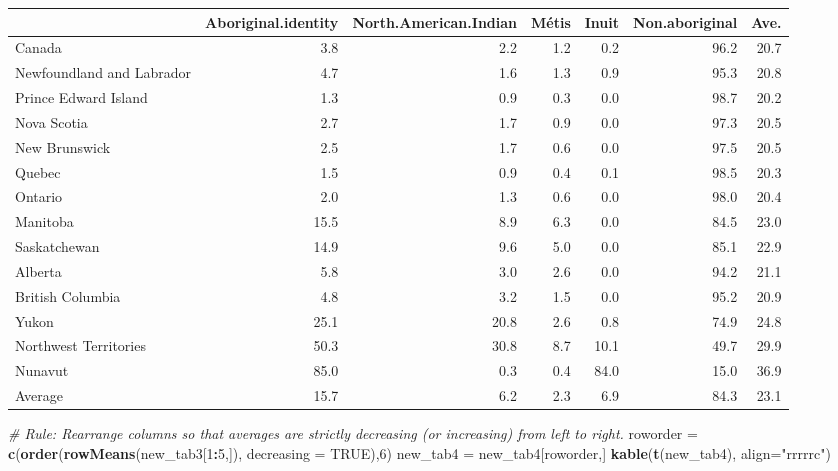 \documentclass[9pt,letter]{article}
\newenvironment{Shaded}{\begin{snugshade}}{\end{snugshade}}
\newcommand{\KeywordTok}[1]{\textcolor[rgb]{0.13,0.29,0.53}{\textbf{#1}}}
\newcommand{\DataTypeTok}[1]{\textcolor[rgb]{0.13,0.29,0.53}{#1}}
\newcommand{\DecValTok}[1]{\textcolor[rgb]{0.00,0.00,0.81}{#1}}
\newcommand{\StringTok}[1]{\textcolor[rgb]{0.31,0.60,0.02}{#1}}
\newcommand{\CommentTok}[1]{\textcolor[rgb]{0.56,0.35,0.01}{\textit{#1}}}
\newcommand{\OtherTok}[1]{\textcolor[rgb]{0.56,0.35,0.01}{#1}}
\newcommand{\OperatorTok}[1]{\textcolor[rgb]{0.81,0.36,0.00}{\textbf{#1}}}
\newcommand{\NormalTok}[1]{#1}
\begin{document}
\begin{longtable}[]{@{}lrrrrrr@{}}
\toprule
& Aboriginal.identity & North.American.Indian & Métis & Inuit &
Non.aboriginal & Ave.\tabularnewline
\midrule
\endhead
Canada & 3.8 & 2.2 & 1.2 & 0.2 & 96.2 & 20.7\tabularnewline
Newfoundland and Labrador & 4.7 & 1.6 & 1.3 & 0.9 & 95.3 &
20.8\tabularnewline
Prince Edward Island & 1.3 & 0.9 & 0.3 & 0.0 & 98.7 &
20.2\tabularnewline
Nova Scotia & 2.7 & 1.7 & 0.9 & 0.0 & 97.3 & 20.5\tabularnewline
New Brunswick & 2.5 & 1.7 & 0.6 & 0.0 & 97.5 & 20.5\tabularnewline
Quebec & 1.5 & 0.9 & 0.4 & 0.1 & 98.5 & 20.3\tabularnewline
Ontario & 2.0 & 1.3 & 0.6 & 0.0 & 98.0 & 20.4\tabularnewline
Manitoba & 15.5 & 8.9 & 6.3 & 0.0 & 84.5 & 23.0\tabularnewline
Saskatchewan & 14.9 & 9.6 & 5.0 & 0.0 & 85.1 & 22.9\tabularnewline
Alberta & 5.8 & 3.0 & 2.6 & 0.0 & 94.2 & 21.1\tabularnewline
British Columbia & 4.8 & 3.2 & 1.5 & 0.0 & 95.2 & 20.9\tabularnewline
Yukon & 25.1 & 20.8 & 2.6 & 0.8 & 74.9 & 24.8\tabularnewline
Northwest Territories & 50.3 & 30.8 & 8.7 & 10.1 & 49.7 &
29.9\tabularnewline
Nunavut & 85.0 & 0.3 & 0.4 & 84.0 & 15.0 & 36.9\tabularnewline
Average & 15.7 & 6.2 & 2.3 & 6.9 & 84.3 & 23.1\tabularnewline
\bottomrule
\end{longtable}

\begin{Shaded}
\begin{Highlighting}[]
\CommentTok{# Rule: Rearrange columns so that averages are strictly decreasing (or increasing) from left to right.}
\NormalTok{roworder =}\StringTok{ }\KeywordTok{c}\NormalTok{(}\KeywordTok{order}\NormalTok{(}\KeywordTok{rowMeans}\NormalTok{(new_tab3[}\DecValTok{1}\OperatorTok{:}\DecValTok{5}\NormalTok{,]), }\DataTypeTok{decreasing =} \OtherTok{TRUE}\NormalTok{),}\DecValTok{6}\NormalTok{)}
\NormalTok{new_tab4 =}\StringTok{ }\NormalTok{new_tab4[roworder,]}
\KeywordTok{kable}\NormalTok{(}\KeywordTok{t}\NormalTok{(new_tab4), }\DataTypeTok{align=}\StringTok{"rrrrrc"}\NormalTok{)}
\end{Highlighting}
\end{Shaded}
\end{document}
